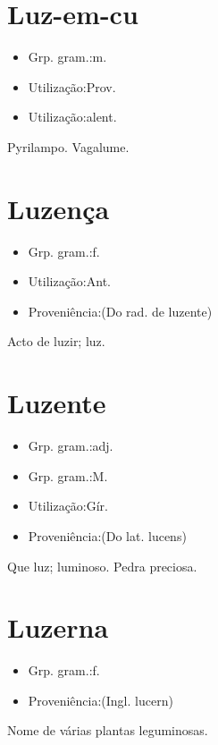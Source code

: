 \section{Luz-em-cu}
\begin{itemize}
\item {Grp. gram.:m.}
\end{itemize}
\begin{itemize}
\item {Utilização:Prov.}
\end{itemize}
\begin{itemize}
\item {Utilização:alent.}
\end{itemize}
Pyrilampo.
Vagalume.
\section{Luzença}
\begin{itemize}
\item {Grp. gram.:f.}
\end{itemize}
\begin{itemize}
\item {Utilização:Ant.}
\end{itemize}
\begin{itemize}
\item {Proveniência:(Do rad. de \textunderscore luzente\textunderscore )}
\end{itemize}
Acto de luzir; luz.
\section{Luzente}
\begin{itemize}
\item {Grp. gram.:adj.}
\end{itemize}
\begin{itemize}
\item {Grp. gram.:M.}
\end{itemize}
\begin{itemize}
\item {Utilização:Gír.}
\end{itemize}
\begin{itemize}
\item {Proveniência:(Do lat. \textunderscore lucens\textunderscore )}
\end{itemize}
Que luz; luminoso.
Pedra preciosa.
\section{Luzerna}
\begin{itemize}
\item {Grp. gram.:f.}
\end{itemize}
\begin{itemize}
\item {Proveniência:(Ingl. \textunderscore lucern\textunderscore )}
\end{itemize}
Nome de várias plantas leguminosas.
